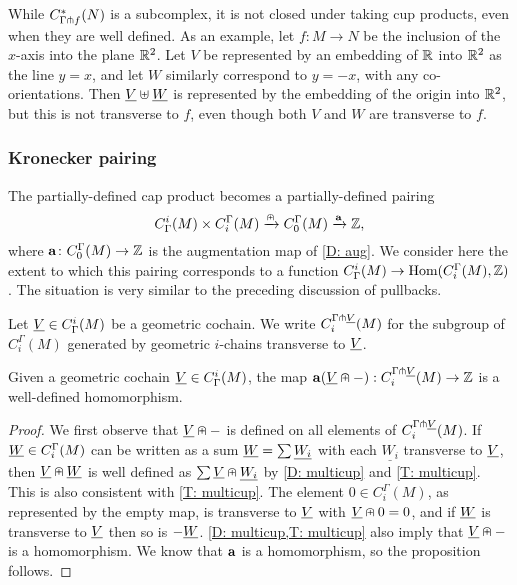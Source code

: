 \begin{remark}
	While $C^*_{\Gamma \pitchfork f}(N)$ is a subcomplex, it is not closed under taking cup products, even when they are well defined.
	As an example, let $f \colon M \to N$ be the inclusion of the $x$-axis into the plane $\mathbb{R}^2$.
	Let $V$ be represented by an embedding of $\mathbb{R}$ into $\mathbb{R}^2$ as the line $y = x$, and let $W$ similarly correspond to $y = -x$, with any co-orientations.
	Then $\underline{V} \uplus \underline{W}$ is represented by the embedding of the origin into $\mathbb{R}^2$, but this is not transverse to $f$, even though both $V$ and $W$ are transverse to $f$.
\end{remark}

\subsubsection{Kronecker pairing}\label{S: Kronecker}

The partially-defined cap product becomes a partially-defined pairing
$$C^i_\Gamma(M) \times C_i^\Gamma(M) \xrightarrow{\nplus} C_0^\Gamma(M) \xrightarrow{\mathbf{a}}\mathbb{Z},$$
where $\mathbf{a} \colon C_0^\Gamma(M) \to \mathbb{Z}$ is the augmentation map of \cref{D: aug}.
We consider here the extent to which this pairing corresponds to a function $C^i_\Gamma(M) \to \textup{Hom}(C_i^\Gamma(M),\mathbb{Z})$.
The situation is very similar to the preceding discussion of pullbacks.

\begin{definition}\label{D: transverse to cohain}
	Let $\underline{V} \in C^i_\Gamma(M)$ be a geometric cochain.
	We write $C_i^{\Gamma \pitchfork \underline{V}}(M)$ for the subgroup of $C_i^\Gamma(M)$ generated by geometric $i$-chains transverse to $\underline{V}$.
\end{definition}

\begin{proposition}
	Given a geometric cochain $\underline{V} \in C^i_\Gamma(M)$, the map $\mathbf{a}(\underline{V}\nplus -):C_i^{\Gamma \pitchfork \underline{V}}(M) \to \mathbb{Z}$ is a well-defined homomorphism.
\end{proposition}

\begin{proof}
	We first observe that $\underline{V}\nplus -$ is defined on all elements of $C_i^{\Gamma \pitchfork \underline{V}}(M)$.
	If $\underline{W} \in C_i^\Gamma(M)$ can be written as a sum $\underline{W} = \sum \underline{W_i}$ with each $\underline{W_i}$ transverse to $\underline{V}$, then $\underline{V}\nplus \underline{W}$ is well defined as $\sum \underline{V}\nplus \underline{W_i}$ by \cref{D: multicup} and \cref{T: multicup}.
	This is also consistent with \cref{T: multicup}.
	The element $0 \in C_i^\Gamma(M)$, as represented by the empty map, is transverse to $\underline{V}$ with $\underline{V}\nplus 0 = 0$, and if $\underline{W}$ is transverse to $\underline{V}$ then so is $-\underline{W}$.
	\cref{D: multicup,T: multicup} also imply that $\underline{V} \nplus -$ is a homomorphism.
	We know that $\mathbf{a}$ is a homomorphism, so the proposition follows.
\end{proof}

